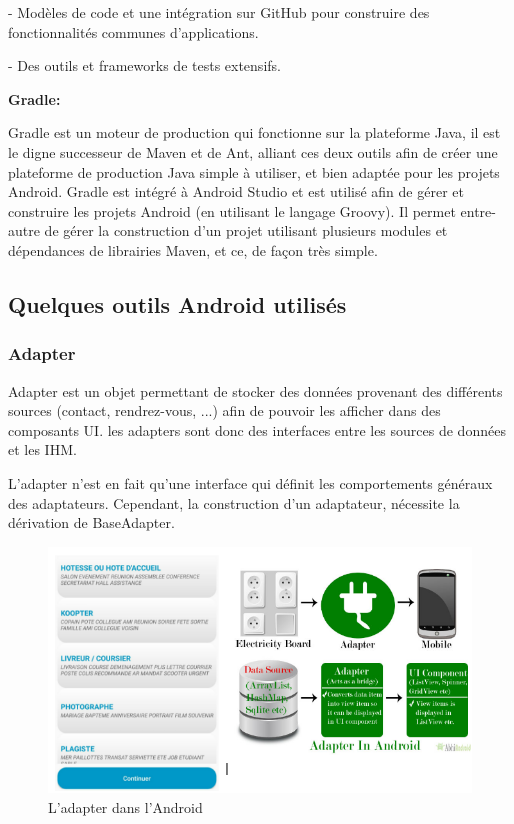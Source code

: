 - Modèles de code et une intégration sur GitHub pour construire des fonctionnalités
communes d’applications.

- Des outils et frameworks de tests extensifs.
 
\textbf{Gradle:}


Gradle est un moteur de production qui fonctionne sur la plateforme Java, il est le digne successeur de Maven et de Ant, alliant ces deux outils afin de créer une plateforme de production Java simple à utiliser, et bien adaptée pour les projets Android.
Gradle est intégré à Android Studio et est utilisé afin de gérer et construire les projets Android (en utilisant le langage Groovy).
Il permet entre-autre de gérer la construction d’un projet utilisant plusieurs modules et dépendances de librairies Maven, et ce, de façon très simple.\cite{gradle} 



\subsection{Quelques outils Android utilisés}
\subsubsection{Adapter}

Adapter est un objet permettant de stocker des données provenant des différents sources (contact, rendrez-vous, ...) afin de pouvoir les afficher dans des composants  UI.
les adapters sont donc des interfaces entre les sources de  données et les IHM. 

L'adapter n'est en fait qu'une interface qui définit les comportements généraux des adaptateurs. Cependant, la construction d'un adaptateur, nécessite la dérivation de BaseAdapter.

\begin{figure}[H]
\begin{center}
\includegraphics[width=1\linewidth]{images/adapter}
\end{center}
\caption{L'adapter dans l'Android}
\label{fig:2}
\end{figure}


